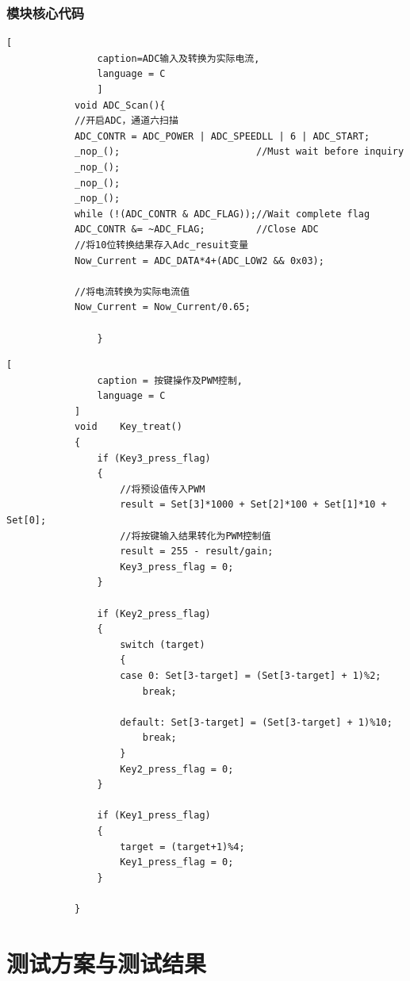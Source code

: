 \documentclass{../source/zjureport}
\begin{document}
            \subsubsection{模块核心代码}
            \begin{lstlisting}[
                caption=ADC输入及转换为实际电流,
                language = C
                ]
            void ADC_Scan(){
            //开启ADC，通道六扫描
            ADC_CONTR = ADC_POWER | ADC_SPEEDLL | 6 | ADC_START;
            _nop_();                        //Must wait before inquiry
            _nop_();
            _nop_();
            _nop_();
            while (!(ADC_CONTR & ADC_FLAG));//Wait complete flag
            ADC_CONTR &= ~ADC_FLAG;         //Close ADC
            //将10位转换结果存入Adc_resuit变量
            Now_Current = ADC_DATA*4+(ADC_LOW2 && 0x03);
                
            //将电流转换为实际电流值
            Now_Current = Now_Current/0.65;
                    
                }
            \end{lstlisting}
            \newpage
            \begin{lstlisting}[
                caption = 按键操作及PWM控制,
                language = C
            ]
            void	Key_treat()
            {
                if (Key3_press_flag)
                {
                    //将预设值传入PWM
                    result = Set[3]*1000 + Set[2]*100 + Set[1]*10 + Set[0];
                    //将按键输入结果转化为PWM控制值
                    result = 255 - result/gain;
                    Key3_press_flag = 0;
                }
            
                if (Key2_press_flag)
                {
                    switch (target)
                    {	
                    case 0: Set[3-target] = (Set[3-target] + 1)%2;
                        break;
                    
                    default: Set[3-target] = (Set[3-target] + 1)%10;
                        break;
                    }
                    Key2_press_flag = 0;
                }
            
                if (Key1_press_flag)
                {
                    target = (target+1)%4;
                    Key1_press_flag = 0;
                }
            
            }
            \end{lstlisting}
            \newpage
    \section{测试方案与测试结果}
\end{document}
